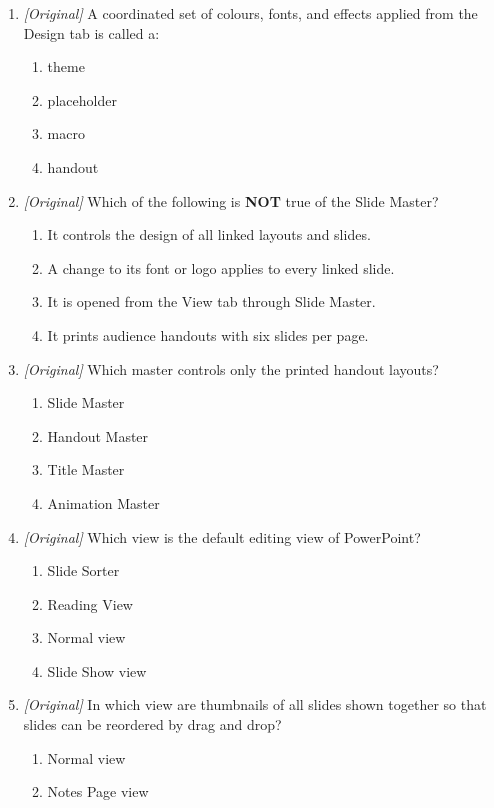 \begin{enumerate}[label=\textbf{Q\arabic*.}, leftmargin=*]
\item \textit{[Original]} A coordinated set of colours, fonts, and effects
  applied from the Design tab is called a:
  \begin{enumerate}[label=\Alph*.]
    \item theme
    \item placeholder
    \item macro
    \item handout
  \end{enumerate}
\item \textit{[Original]} Which of the following is \textbf{NOT} true of the
  Slide Master?
  \begin{enumerate}[label=\Alph*.]
    \item It controls the design of all linked layouts and slides.
    \item A change to its font or logo applies to every linked slide.
    \item It is opened from the View tab through Slide Master.
    \item It prints audience handouts with six slides per page.
  \end{enumerate}
\item \textit{[Original]} Which master controls only the printed handout
  layouts?
  \begin{enumerate}[label=\Alph*.]
    \item Slide Master
    \item Handout Master
    \item Title Master
    \item Animation Master
  \end{enumerate}
\item \textit{[Original]} Which view is the default editing view of
  PowerPoint?
  \begin{enumerate}[label=\Alph*.]
    \item Slide Sorter
    \item Reading View
    \item Normal view
    \item Slide Show view
  \end{enumerate}
\item \textit{[Original]} In which view are thumbnails of all slides shown
  together so that slides can be reordered by drag and drop?
  \begin{enumerate}[label=\Alph*.]
    \item Normal view
    \item Notes Page view

\end{enumerate}
\end{enumerate}
